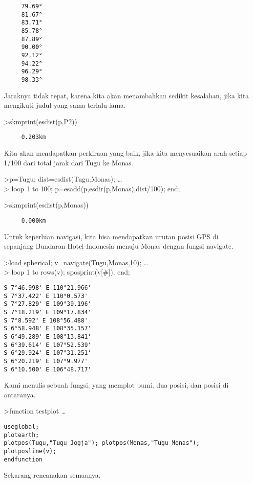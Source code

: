 \documentclass[
]{book}
\begin{document}
\begin{verbatim}
     79.69°
     81.67°
     83.71°
     85.78°
     87.89°
     90.00°
     92.12°
     94.22°
     96.29°
     98.33°
\end{verbatim}

Jaraknya tidak tepat, karena kita akan menambahkan sedikit kesalahan, jika kita mengikuti judul yang sama terlalu lama.

\textgreater skmprint(esdist(p,P2))

\begin{verbatim}
     0.203km
\end{verbatim}

Kita akan mendapatkan perkiraan yang baik, jika kita menyesuaikan arah setiap 1/100 dari total jarak dari Tugu ke Monas.

\textgreater p=Tugu; dist=esdist(Tugu,Monas); \ldots{}\\
\textgreater{} loop 1 to 100; p=esadd(p,esdir(p,Monas),dist/100); end;

\textgreater skmprint(esdist(p,Monas))

\begin{verbatim}
     0.000km
\end{verbatim}

Untuk keperluan navigasi, kita bisa mendapatkan urutan posisi GPS di sepanjang Bundaran Hotel Indonesia menuju Monas dengan fungsi navigate.

\textgreater load spherical; v=navigate(Tugu,Monas,10); \ldots{}\\
\textgreater{} loop 1 to rows(v); sposprint(v{[}\#{]}), end;

\begin{verbatim}
S 7°46.998' E 110°21.966'
S 7°37.422' E 110°0.573'
S 7°27.829' E 109°39.196'
S 7°18.219' E 109°17.834'
S 7°8.592' E 108°56.488'
S 6°58.948' E 108°35.157'
S 6°49.289' E 108°13.841'
S 6°39.614' E 107°52.539'
S 6°29.924' E 107°31.251'
S 6°20.219' E 107°9.977'
S 6°10.500' E 106°48.717'
\end{verbatim}

Kami menulis sebuah fungsi, yang memplot bumi, dua posisi, dan posisi di antaranya.

\textgreater function testplot \ldots{}

\begin{verbatim}
useglobal;
plotearth;
plotpos(Tugu,"Tugu Jogja"); plotpos(Monas,"Tugu Monas");
plotposline(v);
endfunction
\end{verbatim}

Sekarang rencanakan semuanya.
\end{document}
